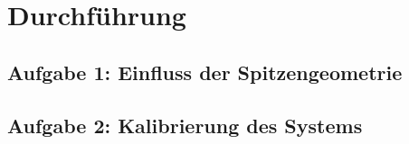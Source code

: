 \chapter{Durchführung}
\section{Aufgabe 1: Einfluss der Spitzengeometrie}

\section{Aufgabe 2: Kalibrierung des Systems}
 \section{}